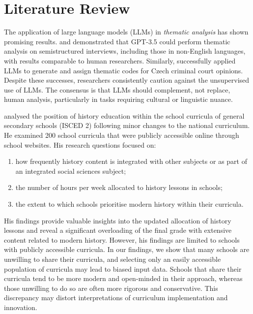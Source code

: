 \documentclass[]{interact}
\theoremstyle{plain}%
\theoremstyle{definition}
\theoremstyle{remark}
\begin{document}
\section{Literature Review}

The application of large language models (LLMs) in \textit{thematic analysis} has shown promising results. \cite{DePaoli2023Can,DePaoli2024Thematic} and \cite{DePaoli2024Reflections} demonstrated that GPT-3.5 could perform thematic analysis on semistructured interviews, including those in non-English languages, with results comparable to human researchers. Similarly, \citet{Drapal2023Using} successfully applied LLMs to generate and assign thematic codes for Czech criminal court opinions. Despite these successes, researchers consistently caution against the unsupervised use of LLMs. The consensus is that LLMs should complement, not replace, human analysis, particularly in tasks requiring cultural or linguistic nuance. 





\cite{Jirecek2023Tricet, Jirecek2023Promeny} analysed the position of history education within the school curricula of general secondary schools (ISCED 2) following minor changes to the national curriculum. He examined 200 school curricula that were publicly accessible online through school websites. His research questions focused on: 

\begin{enumerate}
	\item how frequently history content is integrated with other subjects or as part of an integrated social sciences subject;
	\item the number of hours per week allocated to history lessons in schools;
	\item the extent to which schools prioritise modern history within their curricula.
\end{enumerate}

His findings provide valuable insights into the updated allocation of history lessons and reveal a significant overloading of the final grade with extensive content related to modern history. However, his findings are limited to schools with publicly accessible curricula. In our findings, we show that many schools are unwilling to share their curricula, and selecting only an easily accessible population of curricula may lead to biased input data. Schools that share their curricula tend to be more modern and open-minded in their approach, whereas those unwilling to do so are often more rigorous and conservative. This discrepancy may distort interpretations of curriculum implementation and innovation.
\end{document}
